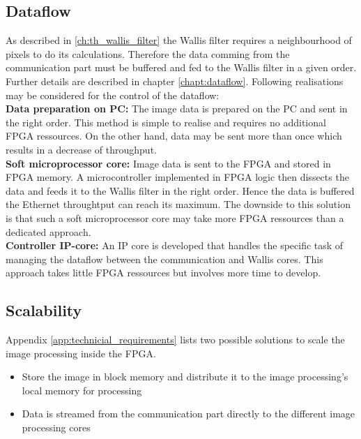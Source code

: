 \subsection{Dataflow} \label{chapt:mission:dataflow}
As described in \ref{ch:th_wallis_filter} the Wallis filter requires a
neighbourhood of pixels to do its calculations. Therefore the data comming from
the communication part must be buffered and fed to the Wallis filter in a given
order. Further details are described in chapter \ref{chapt:dataflow}. Following
realisations may be considered for the control of the dataflow:\\

\textbf{Data preparation on PC:} The image data is prepared on the PC and sent
in the right order. This method is simple to realise and requires no
additional FPGA ressources. On the other hand, data may be sent more than once
which results in a decrease of throughput.\\

\textbf{Soft microprocessor core:} Image data is sent to the FPGA and stored in
FPGA memory. A microcontroller implemented in FPGA logic then dissects the data
and feeds it to the Wallis filter in the right order. Hence the data is buffered
the Ethernet throughtput can reach its maximum. The downside to this solution
is that such a soft microprocessor core may take more FPGA ressources than a
dedicated approach.\\

\textbf{Controller IP-core:} An IP core is developed that handles the specific
task of managing the dataflow between the communication and Wallis cores. This
approach takes little FPGA ressources but involves more time to develop.

\subsection{Scalability} \label{chapt:mission:scalability}
Appendix \ref{app:technicial_requirements} lists two possible solutions to scale
the image processing inside the FPGA. 
\begin{itemize}
    \item Store the image in block memory and distribute it to the image
    processing's local memory for processing
    \item Data is streamed from the communication part directly to the different
    image processing cores
\end{itemize}

%
%
\clearpage
